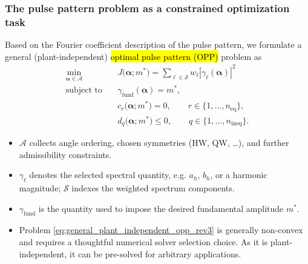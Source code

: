 \begin{frame}
    \frametitle{The pulse pattern problem as a constrained optimization task}
    Based on the Fourier coefficient description of the pulse pattern, we formulate a general (plant-independent) \hl{optimal pulse pattern (OPP)} problem as
    \begin{equation}
        \begin{aligned}
            \min_{\bm{\alpha}\in\mathcal{A}} \quad &
            J\bigl(\bm{\alpha};m^*\bigr)
            =
            \sum_{\ell\in\mathcal{S}}
            w_\ell\left|\gamma_\ell(\bm{\alpha})\right|^2 \\
            \text{subject to} \quad                &
            \gamma_{\mathrm{fund}}(\bm{\alpha})=m^*,      \\
                                                   &
            c_r\bigl(\bm{\alpha};m^*\bigr)=0,
            \qquad
            r\in\{1,\ldots,n_\mathrm{eq}\},
            \\
                                                   &
            d_q\bigl(\bm{\alpha};m^*\bigr)\leq 0,
            \qquad
            q\in\{1,\ldots,n_\mathrm{ineq}\}.
        \end{aligned}
        \label{eq:general_plant_independent_opp_rev3}
    \end{equation}

    \begin{itemize}
        \item<2-> \(\mathcal{A}\) collects angle ordering, chosen symmetries (HW, QW, \dots), and further admissibility constraints.
        \item<3-> \(\gamma_\ell\) denotes the selected spectral quantity, e.g. \(a_h\), \(b_h\), or a harmonic magnitude; \(\mathcal{S}\) indexes the weighted spectrum components.
        \item<4-> \(\gamma_{\mathrm{fund}}\) is the quantity used to impose the desired fundamental amplitude \(m^*\).
        \item<5-> Problem \eqref{eq:general_plant_independent_opp_rev3} is generally non-convex and requires a thoughtful numerical solver selection choice. As it is plant-independent, it can be pre-solved for arbitrary applications.
    \end{itemize}
\end{frame}

